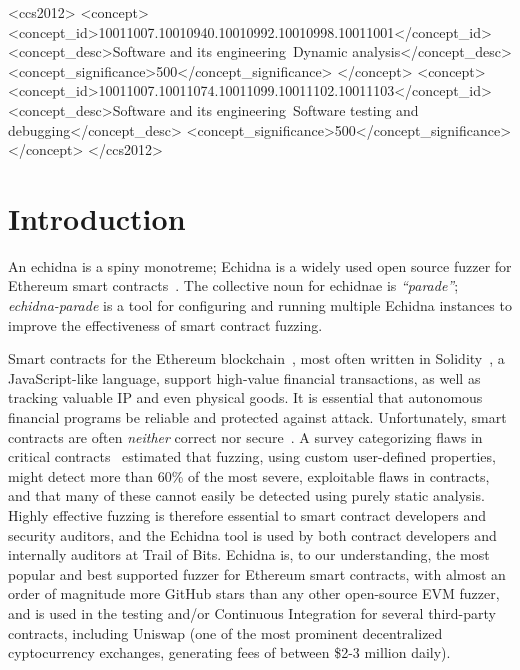 \documentclass[sigconf,screen]{acmart}
\begin{document}
\begin{CCSXML}
<ccs2012>
<concept>
<concept_id>10011007.10010940.10010992.10010998.10011001</concept_id>
<concept_desc>Software and its engineering~Dynamic analysis</concept_desc>
<concept_significance>500</concept_significance>
</concept>
<concept>
<concept_id>10011007.10011074.10011099.10011102.10011103</concept_id>
<concept_desc>Software and its engineering~Software testing and debugging</concept_desc>
<concept_significance>500</concept_significance>
</concept>
</ccs2012>
\end{CCSXML}




\maketitle

\section{Introduction}

An echidna is a spiny monotreme; Echidna is a widely used open source fuzzer for
Ethereum smart contracts~\cite{echidnaissta}.  The collective noun for
echidnae is \emph{``parade''}; \emph{echidna-parade} is a tool for configuring and
running multiple Echidna instances to improve the
effectiveness of smart contract fuzzing.

Smart contracts for the Ethereum blockchain~\cite{buterin2013whitepaper}, most often written in Solidity~\cite{wood2014yellow}, a
JavaScript-like language, support high-value financial transactions,
as well as tracking valuable IP and even physical goods.  It is essential that
autonomous financial programs be reliable and protected against
attack.  Unfortunately, smart contracts are often \emph{neither}
correct nor secure~\cite{SurveyAttacks}.  A survey categorizing flaws
in critical contracts~\cite{FC20} estimated that fuzzing, using custom
user-defined properties, might detect more than 60\% of the most
severe, exploitable flaws in contracts, and that many of these cannot easily
be detected using purely static analysis.  Highly effective fuzzing is
therefore essential to smart contract developers and security
auditors, and the Echidna tool is used by both contract developers
and internally auditors at Trail of Bits.  Echidna is, to our
understanding, the most popular and best supported fuzzer for Ethereum
smart contracts, with almost an order of magnitude more GitHub stars
than any other open-source EVM fuzzer, and is used in the testing
and/or Continuous
Integration for several third-party contracts, including
Uniswap (one of the most prominent decentralized cyptocurrency
exchanges, generating fees of between \$2-3 million daily).
\end{document}
